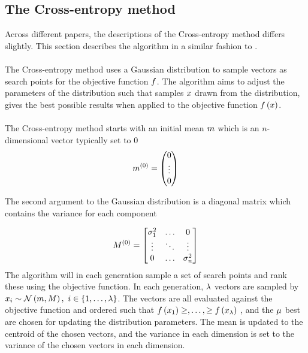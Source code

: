 \subsection{The Cross-entropy method \label{CrossEntropy}}
Across different papers, the descriptions of the Cross-entropy method 
differs slightly. This section
describes the algorithm in a similar fashion 
to \citep{thiery:09}.\\
\\
The Cross-entropy method uses a Gaussian distribution to 
sample vectors as search points for the objective function
$f$. The algorithm aims to 
adjust the parameters of the distribution
such that samples $x$ drawn from the distribution,
gives the best possible results when applied to the
objective function $f \left( x \right)$.\\
\\
The Cross-entropy method starts with an initial 
mean $m$ which is an $n$-dimensional vector
typically set to 0
\begin{align}
m^{(0)} = \begin{pmatrix}
0\\
\vdots\\
0
\end{pmatrix} 
\end{align}

The second argument to the Gaussian distribution is a 
diagonal matrix which contains the variance for each 
component

\begin{align}
M^{(0)} =
\begin{bmatrix}
\sigma_1^{2} & \hdots & 0\\
\vdots & \ddots & \vdots\\
0 & \hdots & \sigma_{n}^{2}
\end{bmatrix}
\end{align}
The algorithm will in each generation sample a set of search points
and rank these using the objective function.
In each generation, $\lambda$ vectors are sampled by 
$x_{i} \sim \mathcal{N} \left(m, M \right)
,\ i \in \{1,\dots,\lambda \}$. The vectors are all evaluated 
against the objective function and ordered such that $f \left( x_{1} \right) \geq, \dots, \geq f \left( x_{\lambda} \right)$
, and the $\mu$ best are chosen for updating the distribution 
parameters. The mean is updated to the centroid of the chosen vectors, and
the variance in each dimension is set to the variance of the chosen vectors in each 
dimension.\\

